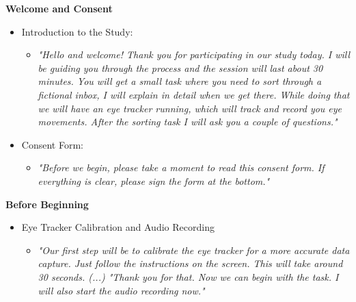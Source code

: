 \documentclass[
  a4paper,  %
  twoside,  %
  bibliography=totoc,
  headsepline,
  cleardoublepage=empty,
  parskip=half,
  draft=false
]{scrbook}
\begin{document}
\textbf{Welcome and Consent}
\begin{itemize}
    \item Introduction to the Study: 
    \begin{itemize}
        \item[ ]\textit{"Hello and welcome! Thank you for participating in our study today.  I will be guiding you through the process and the session will last about 30 minutes. You will get a small task where you need to sort through a fictional inbox, I will explain in detail when we get there. While doing that we will have an eye tracker running, which will track and record you eye movements. After the sorting task I will ask you a couple of questions."}
    \end{itemize}

    \item Consent Form:
        \begin{itemize}
            \item[ ]\textit{ "Before we begin, please take a moment to read this consent form. If everything is clear, please sign the form at the bottom."}
        \end{itemize}
        
\end{itemize}

\textbf{Before Beginning}
\begin{itemize}
    \item Eye Tracker Calibration and Audio Recording
        \begin{itemize}
            \item[] \textit{"Our first step will be to calibrate the eye tracker for a more accurate data capture. Just follow the instructions on the screen. This will take around 30 seconds. (...) "Thank you for that. Now we can begin with the task. I will also start the audio recording now."}
        \end{itemize}
\end{itemize}
\end{document}
